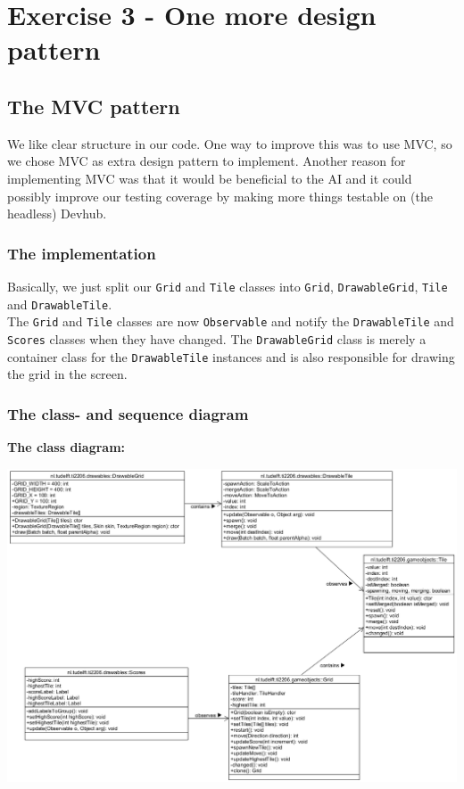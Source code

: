 \documentclass[a4paper,11pt,report]{scrartcl}
\begin{document}
\newpage\section{Exercise 3 - One more design pattern}
\subsection{The MVC pattern}
We like clear structure in our code. One way to improve this was to use MVC, so
we chose MVC as extra design pattern to implement. Another reason for
implementing MVC was that it would be beneficial to the AI and it could possibly
improve our testing coverage by making more things testable on (the headless)
Devhub.

\subsubsection{The implementation}
Basically, we just split our \texttt{Grid} and \texttt{Tile} classes into
\texttt{Grid}, \texttt{DrawableGrid}, \texttt{Tile} and \texttt{DrawableTile}.\\

The \texttt{Grid} and \texttt{Tile} classes are now \texttt{Observable} and
notify the \texttt{DrawableTile} and \texttt{Scores} classes when they have
changed. The \texttt{DrawableGrid} class is merely a container class for the
\texttt{DrawableTile} instances and is also responsible for drawing the grid in
the screen.\\

\newpage\subsubsection{The class- and sequence diagram}
\textbf{The class diagram:}\\
\centerline{\includegraphics[scale=0.7]{sources/mvcPattern}}
\end{document}
